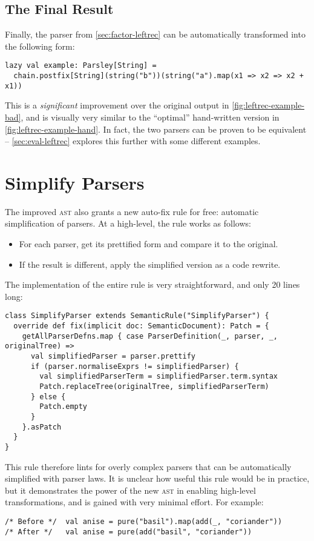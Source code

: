 \documentclass[../../main.tex]{subfiles}
\begin{document}
\subsection*{The Final Result}
Finally, the  parser from \cref{sec:factor-leftrec} can be automatically transformed into the following form:
\begin{verbatim}
lazy val example: Parsley[String] =
  chain.postfix[String](string("b"))(string("a").map(x1 => x2 => x2 + x1))
\end{verbatim}
%
This is a \emph{significant} improvement over the original output in \cref{fig:leftrec-example-bad}, and is visually very similar to the ``optimal'' hand-written version in \cref{fig:leftrec-example-hand}.
In fact, the two parsers can be proven to be equivalent -- \cref{sec:eval-leftrec} explores this further with some different examples.

\section{Simplify Parsers}\label{sec:simplify-parsers-rule}
The improved  \textsc{ast} also grants a new auto-fix rule for free: automatic simplification of parsers.
At a high-level, the rule works as follows:
\begin{itemize}
  \item For each parser, get its prettified form and compare it to the original.
  \item If the result is different, apply the simplified version as a code rewrite.
\end{itemize}
%
The implementation of the entire rule is very straightforward, and only 20 lines long:
\begin{verbatim}
class SimplifyParser extends SemanticRule("SimplifyParser") {
  override def fix(implicit doc: SemanticDocument): Patch = {
    getAllParserDefns.map { case ParserDefinition(_, parser, _, originalTree) =>
      val simplifiedParser = parser.prettify
      if (parser.normaliseExprs != simplifiedParser) {
        val simplifiedParserTerm = simplifiedParser.term.syntax
        Patch.replaceTree(originalTree, simplifiedParserTerm)
      } else {
        Patch.empty
      }
    }.asPatch
  }
}
\end{verbatim}
%
This rule therefore lints for overly complex parsers that can be automatically simplified with parser laws.
It is unclear how useful this rule would be in practice, but it demonstrates the power of the new  \textsc{ast} in enabling high-level transformations, and is gained with very minimal effort.
For example:
\begin{verbatim}
/* Before */  val anise = pure("basil").map(add(_, "coriander"))
/* After */   val anise = pure(add("basil", "coriander"))
\end{verbatim}
\end{document}
